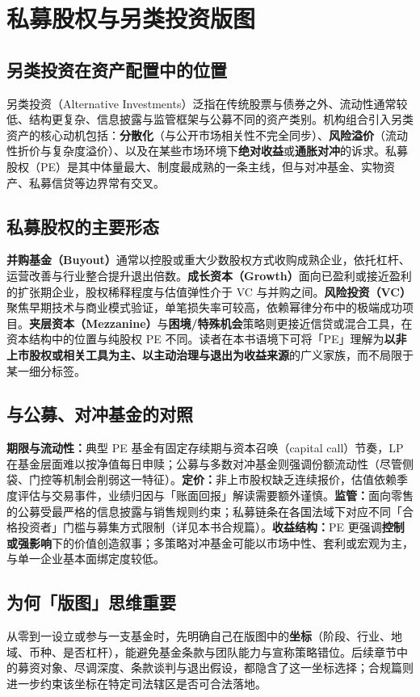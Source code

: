 \chapter{私募股权与另类投资版图}

\section{另类投资在资产配置中的位置}

另类投资（Alternative Investments）泛指在传统股票与债券之外、流动性通常较低、结构更复杂、信息披露与监管框架与公募不同的资产类别。机构组合引入另类资产的核心动机包括：\textbf{分散化}（与公开市场相关性不完全同步）、\textbf{风险溢价}（流动性折价与复杂度溢价）、以及在某些市场环境下\textbf{绝对收益}或\textbf{通胀对冲}的诉求。私募股权（PE）是其中体量最大、制度最成熟的一条主线，但与对冲基金、实物资产、私募信贷等边界常有交叉。

\section{私募股权的主要形态}

\textbf{并购基金（Buyout）}通常以控股或重大少数股权方式收购成熟企业，依托杠杆、运营改善与行业整合提升退出倍数。\textbf{成长资本（Growth）}面向已盈利或接近盈利的扩张期企业，股权稀释程度与估值弹性介于 VC 与并购之间。\textbf{风险投资（VC）}聚焦早期技术与商业模式验证，单笔损失率可较高，依赖幂律分布中的极端成功项目。\textbf{夹层资本（Mezzanine）}与\textbf{困境/特殊机会}策略则更接近信贷或混合工具，在资本结构中的位置与纯股权 PE 不同。读者在本书语境下可将「PE」理解为\textbf{以非上市股权或相关工具为主、以主动治理与退出为收益来源}的广义家族，而不局限于某一细分标签。

\section{与公募、对冲基金的对照}

\textbf{期限与流动性：}典型 PE 基金有固定存续期与资本召唤（capital call）节奏，LP 在基金层面难以按净值每日申赎；公募与多数对冲基金则强调份额流动性（尽管侧袋、门控等机制会削弱这一特征）。\textbf{定价：}非上市股权缺乏连续报价，估值依赖季度评估与交易事件，业绩归因与「账面回报」解读需要额外谨慎。\textbf{监管：}面向零售的公募受最严格的信息披露与销售规则约束；私募链条在各国法域下对应不同「合格投资者」门槛与募集方式限制（详见本书合规篇）。\textbf{收益结构：}PE 更强调\textbf{控制或强影响}下的价值创造叙事；多策略对冲基金可能以市场中性、套利或宏观为主，与单一企业基本面绑定度较低。

\section{为何「版图」思维重要}

从零到一设立或参与一支基金时，先明确自己在版图中的\textbf{坐标}（阶段、行业、地域、币种、是否杠杆），能避免基金条款与团队能力与宣称策略错位。后续章节中的募资对象、尽调深度、条款谈判与退出假设，都隐含了这一坐标选择；合规篇则进一步约束该坐标在特定司法辖区是否可合法落地。

